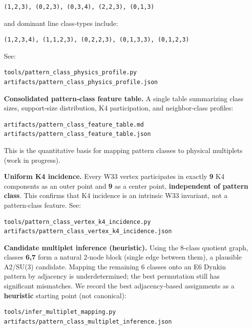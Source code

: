 \documentclass[11pt]{article}
\begin{document}
\begin{verbatim}
(1,2,3), (0,2,3), (0,3,4), (2,2,3), (0,1,3)
\end{verbatim}

and dominant line class‑types include:

\begin{verbatim}
(1,2,3,4), (1,1,2,3), (0,2,2,3), (0,1,3,3), (0,1,2,3)
\end{verbatim}

See:

\begin{verbatim}
tools/pattern_class_physics_profile.py
artifacts/pattern_class_physics_profile.json
\end{verbatim}

\textbf{Consolidated pattern‑class feature table.} A single table
summarizing class sizes, support‑size distribution, K4 participation,
and neighbor‑class profiles:

\begin{verbatim}
artifacts/pattern_class_feature_table.md
artifacts/pattern_class_feature_table.json
\end{verbatim}

This is the quantitative basis for mapping pattern classes to physical
multiplets (work in progress).

\textbf{Uniform K4 incidence.} Every W33 vertex participates in exactly
\textbf{9} K4 components as an outer point and \textbf{9} as a center
point, \textbf{independent of pattern class}. This confirms that K4
incidence is an intrinsic W33 invariant, not a pattern‑class feature.
See:

\begin{verbatim}
tools/pattern_class_vertex_k4_incidence.py
artifacts/pattern_class_vertex_k4_incidence.json
\end{verbatim}

\textbf{Candidate multiplet inference (heuristic).} Using the 8‑class
quotient graph, classes \textbf{6,7} form a natural 2‑node block (single
edge between them), a plausible A2/SU(3) candidate. Mapping the
remaining 6 classes onto an E6 Dynkin pattern by adjacency is
underdetermined; the best permutation still has significant mismatches.
We record the best adjacency‑based assignments as a \textbf{heuristic}
starting point (not canonical):

\begin{verbatim}
tools/infer_multiplet_mapping.py
artifacts/pattern_class_multiplet_inference.json
\end{verbatim}
\end{document}
